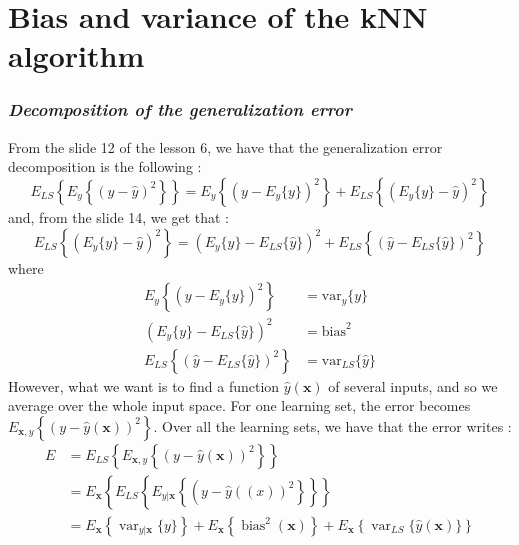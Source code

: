 \section{Bias and variance of the kNN algorithm}

\subsubsection{{\it Decomposition of the generalization error}}
From the slide 12 of the lesson 6, we have that the generalization error decomposition is the following :
$$
E_{L S}\left\{E_{y}\left\{(y-\hat{y})^{2}\right\}\right\} = E_{y}\left\{\left(y-E_{y}\{y\}\right)^{2}\right\} + E_{L S}\left\{\left(E_{y}\{y\}-\hat{y}\right)^{2}\right\}
$$
and, from the slide 14, we get that : 
$$
E_{L S}\left\{\left(E_{y}\{y\}-\hat{y}\right)^{2}\right\} = \left(E_{y}\{y\}-E_{L S}\{\hat{y}\}\right)^{2}+E_{L S}\left\{\left(\hat{y}-E_{L S}\{\hat{y}\}\right)^{2}\right\}
$$
where
\begin{align*}
    E_{y}\left\{\left(y-E_{y}\{y\}\right)^{2}\right\} &= \text{var}_y\{y\}\\
    \left(E_{y}\{y\}-E_{L S}\{\hat{y}\}\right)^{2} &= \text{bias}^2\\
    E_{L S}\left\{\left(\hat{y}-E_{L S}\{\hat{y}\}\right)^{2}\right\} &= \text{var}_{LS}\{\hat{y}\}
\end{align*}
However, what we want is to find a function $\hat{y}(\mathbf{x})$ of several inputs, and so we average over the whole input space. For one learning set, the error becomes $E_{\mathbf{x}, y}\left\{(y-\hat{y}(\mathbf{x}))^{2}\right\}$. Over all the learning sets, we have that the error writes : 
\begin{align*}
    E &= E_{L S}\left\{E_{\mathbf{x}, y}\left\{(y-\hat{y}(\mathbf{x}))^{2}\right\}\right\}\\
    &= E_{\mathbf{x}}\left\{E_{L S}\left\{E_{y | \mathbf{x}}\left\{\left(y-\hat{y}((x))^{2}\right\}\right\}\right\}\right.\\
    &= E_{\mathbf{x}}\left\{\operatorname{var}_{y | \mathbf{x}}\{y\}\right\}+E_{\mathbf{x}}\left\{\operatorname{bias}^{2}(\mathbf{x})\right\}+E_{\mathbf{x}}\left\{\operatorname{var}_{L S}\{\hat{y}(\mathbf{x})\}\right\}
\end{align*}
